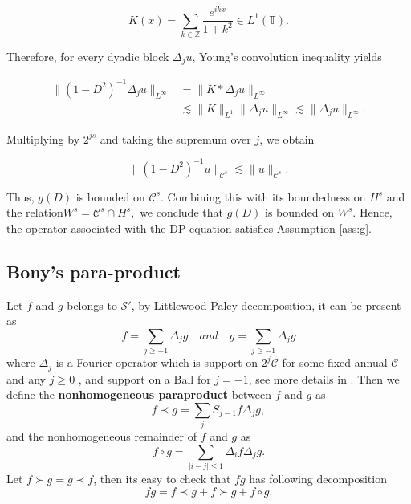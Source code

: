 \documentclass{article}
\numberwithin{equation}{section}
\newcommand{\ml}{\mathcal}
\begin{document}
$$
K(x)=\sum_{k\in\mathbb Z}\frac{e^{ikx}}{1+k^2}\in L^1(\mathbb T).
$$

Therefore, for every dyadic block \(\Delta_j u\), Young's convolution inequality yields

$$
\begin{aligned}
\|(1-D^2)^{-1}\Delta_j u\|_{L^\infty}
&=\|K*\Delta_j u\|_{L^\infty}\\
&\lesssim \|K\|_{L^1}\|\Delta_j u\|_{L^\infty}
\lesssim \|\Delta_j u\|_{L^\infty}.
\end{aligned}
$$

Multiplying by \(2^{js}\) and taking the supremum over \(j\), we obtain

$$
\|(1-D^2)^{-1}u\|_{\ml C^s}
\lesssim
\|u\|_{\ml C^s}.
$$

Thus, \(g(D)\) is bounded on \(\ml C^s\). Combining this with its boundedness on \(H^s\) and the relation$W^s=\ml C^s\cap H^s,$ we conclude that \(g(D)\) is bounded on \(W^s\). Hence, the operator associated with the DP equation satisfies Assumption \ref{ass:g}.
\subsection{Bony's para-product}\label{subsec;Littlewood-Paley}
Let $f$ and $g$ belongs to $\ml S'$, by Littlewood-Paley decomposition, it can be present as 
$$f=\sum_{j\geq -1} \Delta_j g\quad and \quad g=\sum_{j\geq -1} \Delta_j g$$
where $\Delta_j$ is a Fourier operator which is support on $2^j\ml C$ for some fixed annual $\ml C$ and any $j\geq 0$ , and support on a Ball for $j=-1$, see more details in \cite{bahouri2011fourier,zhang2025resultsfractionalroughburgers}. Then we define the \textbf{nonhomogeneous paraproduct} between $f$ and $g$ as 
\begin{equation}
	f\prec g=\sum_{j}S_{j-1} f\Delta_jg,
\end{equation}
and the nonhomogeneous remainder of $f$ and $g$ as 
\begin{equation}
	f\circ g=\sum_{\vert i-j\vert\leq 1}\Delta_if \Delta_jg.
\end{equation}
Let $f\succ g=g\prec f$, then its easy to check that $fg$ has following decomposition
\begin{equation}
	fg= f\prec g+f\succ g+f\circ g.
\end{equation}
\end{document}
